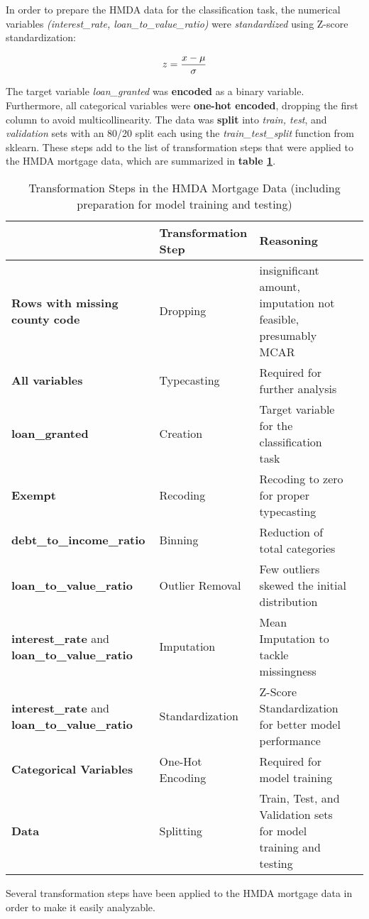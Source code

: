 In order to prepare the HMDA data for the classification task, the numerical variables \textit{(interest\_rate, loan\_to\_value\_ratio)} were \textit{standardized} using Z-score standardization: 

\begin{equation}
    z = \frac{x - \mu}{\sigma}
    \label{eq:Z-Score Standardization}
    \addcontentsline{frm}{formulas}{\protect\numberline{\theequation}\hspace{1em}Z-Score Standardization}
\end{equation}

The target variable \textit{loan\_granted} was \textbf{encoded} as a binary variable. Furthermore, all categorical variables were \textbf{one-hot encoded}, dropping the first column to avoid multicollinearity.
The data was \textbf{split} into \textit{train, test}, and \textit{validation} sets with an 80/20 split each using the \textit{train\_test\_split} function from sklearn.
These steps add to the list of transformation steps that were applied to the HMDA mortgage data, which are summarized in \textbf{table \ref{tab:HMDA_transformation_summary_2}}.

\begin{table}[h]
    \centering
    \begin{tabularx}{\textwidth}{l *{3}{>{\centering\arraybackslash}X}}
    \hline
     & \textbf{Transformation Step} & \textbf{Reasoning} \\
    \hline
    \textbf{Rows with missing county code} & Dropping & insignificant amount, imputation not feasible, presumably MCAR \\
    \textbf{All variables} & Typecasting & Required for further analysis \\
    \textbf{loan\_granted} & Creation & Target variable for the classification task \\
    \textbf{Exempt} & Recoding & Recoding to zero for proper typecasting \\
    \textbf{debt\_to\_income\_ratio} & Binning & Reduction of total categories \\
    \textbf{loan\_to\_value\_ratio} & Outlier Removal & Few outliers skewed the initial distribution \\
    \textbf{interest\_rate} and \textbf{loan\_to\_value\_ratio} & Imputation & Mean Imputation to tackle missingness \\
    \textbf{interest\_rate} and \textbf{loan\_to\_value\_ratio} & Standardization & Z-Score Standardization for better model performance \\
    \textbf{Categorical Variables} & One-Hot Encoding & Required for model training \\
    \textbf{Data} & Splitting & Train, Test, and Validation sets for model training and testing \\
    \hline
    \end{tabularx}
    \caption{Transformation Steps in the HMDA Mortgage Data (including preparation for model training and testing)}
    \small
    Several transformation steps have been applied to the HMDA mortgage data in order to make it easily analyzable.
    \label{tab:HMDA_transformation_summary_2}
\end{table}

